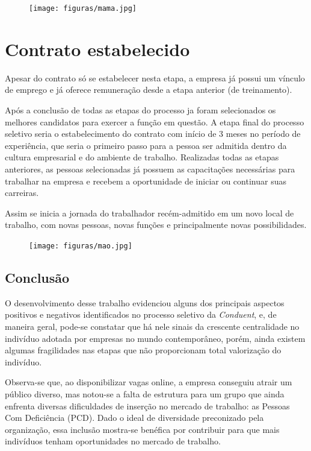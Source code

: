 \documentclass[12pt]{article}
\begin{document}
\begin{figure}[h]

\centering
\texttt{[image: figuras/mama.jpg]}
\end{figure}
\chapter{Contrato estabelecido}
Apesar do contrato só se estabelecer nesta etapa, a empresa já possui um vínculo de emprego e já oferece remuneração desde a etapa anterior (de treinamento).

Após a conclusão de todas as etapas do processo ja foram selecionados os melhores candidatos para exercer a função em questão. A etapa final do processo seletivo seria o estabelecimento do contrato com início de 3 meses no período de experiência, que seria o primeiro passo para a pessoa ser admitida dentro da cultura empresarial e do ambiente de trabalho. Realizadas todas as etapas anteriores, as pessoas selecionadas já possuem as capacitações necessárias para trabalhar na empresa e recebem a oportunidade de iniciar ou continuar suas carreiras.

Assim se inicia a jornada do trabalhador recém-admitido em um novo local de trabalho, com novas pessoas, novas funções e principalmente novas possibilidades.

\begin{figure}[h]

\centering
\texttt{[image: figuras/mao.jpg]}
\end{figure}


\section{Conclusão}

O desenvolvimento desse trabalho evidenciou alguns dos principais aspectos positivos e negativos identificados no processo seletivo da \emph{Conduent}, e, de maneira geral, pode-se constatar que há nele sinais da crescente centralidade no indivíduo adotada por empresas no mundo contemporâneo, porém, ainda existem algumas fragilidades nas etapas que não proporcionam total valorização do indivíduo.

Observa-se que, ao disponibilizar vagas online, a empresa conseguiu atrair um público diverso, mas notou-se a falta de estrutura para um grupo que ainda enfrenta diversas dificuldades de inserção no mercado de trabalho: as Pessoas Com Deficiência (PCD). Dado o ideal de diversidade preconizado pela organização, essa inclusão mostra-se benéfica por contribuir para que mais indivíduos tenham oportunidades no mercado de trabalho. 
\end{document}
